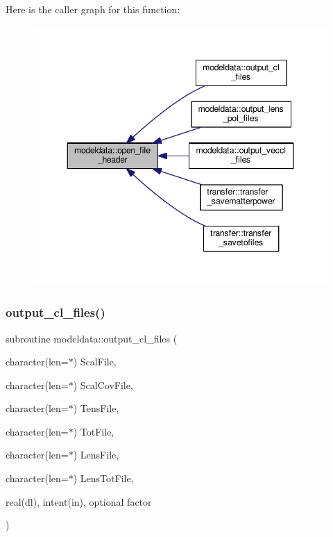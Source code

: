 Here is the caller graph for this function\+:
\nopagebreak
\begin{figure}[H]
\begin{center}
\leavevmode
\includegraphics[width=348pt]{namespacemodeldata_abab5acd24b50e4d884e84682fed17a52_icgraph}
\end{center}
\end{figure}
\mbox{\label{namespacemodeldata_ace30b2a5cf368aaadfbdaf70dcc20a9e}} 
\subsubsection{\texorpdfstring{output\+\_\+cl\+\_\+files()}{output\_cl\_files()}}
{\footnotesize\ttfamily subroutine modeldata\+::output\+\_\+cl\+\_\+files (\begin{DoxyParamCaption}\item[{character(len=$\ast$)}]{Scal\+File,  }\item[{character(len=$\ast$)}]{Scal\+Cov\+File,  }\item[{character(len=$\ast$)}]{Tens\+File,  }\item[{character(len=$\ast$)}]{Tot\+File,  }\item[{character(len=$\ast$)}]{Lens\+File,  }\item[{character(len=$\ast$)}]{Lens\+Tot\+File,  }\item[{real(dl), intent(in), optional}]{factor }\end{DoxyParamCaption})}



